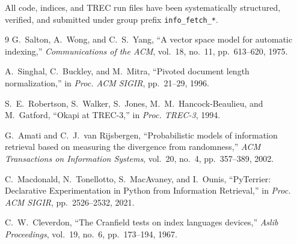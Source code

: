 \documentclass[10pt, a4paper]{article}
\begin{document}
All code, indices, and TREC run files have been systematically structured, verified, and submitted under group prefix \texttt{info\_fetch\_*}.

\begin{thebibliography}{9}
G.~Salton, A.~Wong, and C.~S.~Yang, ``A vector space model for automatic indexing,'' \textit{Communications of the ACM}, vol.~18, no.~11, pp.~613--620, 1975.

A.~Singhal, C.~Buckley, and M.~Mitra, ``Pivoted document length normalization,'' in \textit{Proc. ACM SIGIR}, pp.~21--29, 1996.

S.~E.~Robertson, S.~Walker, S.~Jones, M.~M.~Hancock-Beaulieu, and M.~Gatford, ``Okapi at TREC-3,'' in \textit{Proc. TREC-3}, 1994.

G.~Amati and C.~J.~van Rijsbergen, ``Probabilistic models of information retrieval based on measuring the divergence from randomness,'' \textit{ACM Transactions on Information Systems}, vol.~20, no.~4, pp.~357--389, 2002.

C.~Macdonald, N.~Tonellotto, S.~MacAvaney, and I.~Ounis, ``PyTerrier: Declarative Experimentation in Python from Information Retrieval,'' in \textit{Proc. ACM SIGIR}, pp.~2526--2532, 2021.

C.~W.~Cleverdon, ``The Cranfield tests on index languages devices,'' \textit{Aslib Proceedings}, vol.~19, no.~6, pp.~173--194, 1967.
\end{thebibliography}
\end{document}
